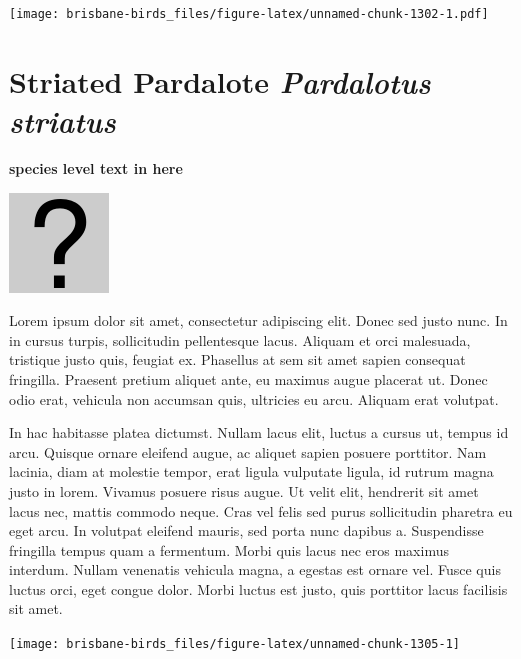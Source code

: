 \documentclass[]{book}
\let\origfigure\figure
\let\endorigfigure\endfigure
\renewenvironment{figure}[1][2] {
  \expandafter\origfigure\expandafter[H]
} {
  \endorigfigure
}
\begin{document}
\begin{figure}
\centering
\texttt{[image: brisbane-birds\_files/figure-latex/unnamed-chunk-1302-1.pdf]}
\caption{\label{fig:unnamed-chunk-1302}insert figure caption}
\end{figure}

\section{\texorpdfstring{Striated Pardalote \emph{Pardalotus
striatus}}{Striated Pardalote Pardalotus striatus}}\label{striated-pardalote-pardalotus-striatus}

\textbf{species level text in here}

\begin{figure}
\centering
\includegraphics{assets/missing.png}
\caption{No image for species}
\end{figure}

Lorem ipsum dolor sit amet, consectetur adipiscing elit. Donec sed justo
nunc. In in cursus turpis, sollicitudin pellentesque lacus. Aliquam et
orci malesuada, tristique justo quis, feugiat ex. Phasellus at sem sit
amet sapien consequat fringilla. Praesent pretium aliquet ante, eu
maximus augue placerat ut. Donec odio erat, vehicula non accumsan quis,
ultricies eu arcu. Aliquam erat volutpat.

In hac habitasse platea dictumst. Nullam lacus elit, luctus a cursus ut,
tempus id arcu. Quisque ornare eleifend augue, ac aliquet sapien posuere
porttitor. Nam lacinia, diam at molestie tempor, erat ligula vulputate
ligula, id rutrum magna justo in lorem. Vivamus posuere risus augue. Ut
velit elit, hendrerit sit amet lacus nec, mattis commodo neque. Cras vel
felis sed purus sollicitudin pharetra eu eget arcu. In volutpat eleifend
mauris, sed porta nunc dapibus a. Suspendisse fringilla tempus quam a
fermentum. Morbi quis lacus nec eros maximus interdum. Nullam venenatis
vehicula magna, a egestas est ornare vel. Fusce quis luctus orci, eget
congue dolor. Morbi luctus est justo, quis porttitor lacus facilisis sit
amet.

\begin{figure}
\texttt{[image: brisbane-birds\_files/figure-latex/unnamed-chunk-1305-1]} \caption{insert figure caption}\label{fig:unnamed-chunk-1305}
\end{figure}
\end{document}
